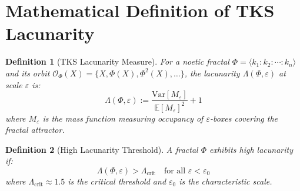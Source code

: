 \documentclass[11pt,twoside]{book}
\newcommand{\Frac}{\Phi}
\newcommand{\Lacunarity}{\Lambda}
\newtheorem{definition}{Definition}[chapter]
\begin{document}
\section{Mathematical Definition of TKS Lacunarity}

\begin{definition}[TKS Lacunarity Measure]
\label{def:tks-lacunarity}
For a noetic fractal $\Frac = \langle k_1 : k_2 : \cdots : k_n \rangle$ and its orbit
$\mathcal{O}_\Frac(X) = \{X, \Frac(X), \Frac^2(X), \ldots\}$, the \emph{lacunarity}
$\Lacunarity(\Frac, \varepsilon)$ at scale $\varepsilon$ is:
\[
    \Lacunarity(\Frac, \varepsilon) := \frac{\mathrm{Var}[M_\varepsilon]}
    {\mathbb{E}[M_\varepsilon]^2} + 1
\]
where $M_\varepsilon$ is the mass function measuring occupancy of $\varepsilon$-boxes
covering the fractal attractor.
\end{definition}

\begin{definition}[High Lacunarity Threshold]
\label{def:high-lac}
A fractal $\Frac$ exhibits \emph{high lacunarity} if:
\[
    \Lacunarity(\Frac, \varepsilon) > \Lacunarity_{\mathrm{crit}}
    \quad \text{for all } \varepsilon < \varepsilon_0
\]
where $\Lacunarity_{\mathrm{crit}} \approx 1.5$ is the critical threshold and
$\varepsilon_0$ is the characteristic scale.
\end{definition}
\end{document}
